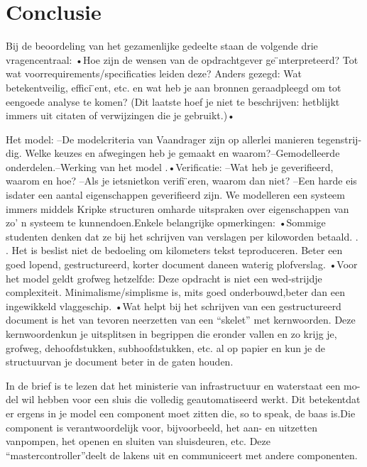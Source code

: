


\section{Conclusie}
Bij de beoordeling van het gezamenlijke gedeelte staan de volgende drie vragencentraal: 
•Hoe zijn de wensen van de opdrachtgever ge ̈ınterpreteerd?  
Tot wat voorrequirements/specificaties  leiden  deze?     
Anders  gezegd:   Wat  betekentveilig, effici ̈ent, etc.  en wat heb je aan bronnen geraadpleegd om tot eengoede  analyse  te  komen?   (Dit  laatste  hoef  je  niet  te  beschrijven:   hetblijkt immers uit citaten of verwijzingen die je gebruikt.)•\ 

Het model: 
–De modelcriteria van Vaandrager zijn op allerlei manieren tegenstrij-dig.   
Welke keuzes en afwegingen heb je gemaakt en waarom?–Gemodelleerde onderdelen.–Werking van het model 
.•Verificatie: 
–Wat heb je geverifieerd, waarom en hoe? 
–Als je ietsnietkon verifi ̈eren, waarom dan niet? 
–Een  harde  eis  isdater  een  aantal  eigenschappen  geverifieerd  zijn. 
We  modelleren  een  systeem  immers  middels  Kripke  structuren  omharde  uitspraken  over  eigenschappen  van  zo’  n  systeem  te  kunnendoen.Enkele belangrijke opmerkingen: 
•Sommige studenten denken dat ze bij het schrijven van verslagen per kiloworden betaald. . . Het is beslist niet de bedoeling om kilometers tekst teproduceren.  Beter een goed lopend, gestructureerd, korter document daneen waterig plofverslag. 
•Voor het model geldt grofweg hetzelfde:  Deze opdracht is niet een wed-strijdje  complexiteit.  Minimalisme/simplisme  is,  mits  goed  onderbouwd,beter dan een ingewikkeld vlaggeschip. 
•Wat helpt bij het schrijven van een gestructureerd document is het van tevoren  neerzetten  van  een  “skelet”  met  kernwoorden.  Deze  kernwoordenkun je uitsplitsen in begrippen die eronder vallen en zo krijg je, grofweg, dehoofdstukken, subhoofdstukken, etc.  al op papier en kun je de structuurvan je document beter in de gaten houden. 


In de brief is te lezen dat het ministerie van infrastructuur en waterstaat een mo-del wil hebben voor een sluis die volledig geautomatiseerd werkt.  Dit betekentdat er ergens in je model een component moet zitten die, so to speak, de baas is.Die component is verantwoordelijk voor, bijvoorbeeld, het aan- en uitzetten vanpompen,  het  openen  en  sluiten  van  sluisdeuren,  etc.   Deze  “mastercontroller”deelt de lakens uit en communiceert met andere componenten. 

